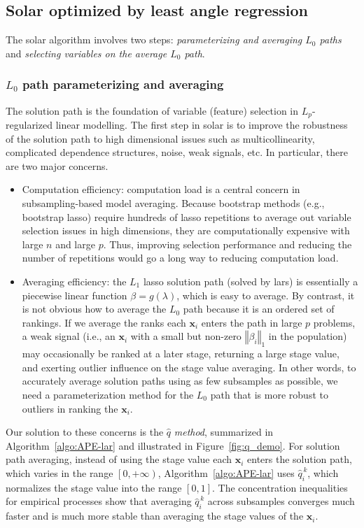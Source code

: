 \documentclass[11pt,review,authoryear]{elsarticle}
\begin{document}
\subsection{Solar optimized by least angle regression}

The solar algorithm involves two steps: \emph{parameterizing and averaging $L_0$ paths} and \emph{selecting variables on the average $L_0$ path}.

\subsubsection{$L_0$ path parameterizing and averaging}

The solution path is the foundation of variable (feature) selection in $L_p$-regularized linear modelling. The first step in solar is to improve the robustness of the solution path to high dimensional issues such as multicollinearity, complicated dependence structures, noise, weak signals, etc. In particular, there are two major concerns.
\begin{itemize}
  \item Computation efficiency: computation load is a central concern in subsampling-based model averaging. Because bootstrap methods (e.g., bootstrap lasso) require hundreds of lasso repetitions to average out variable selection issues in high dimensions, they are computationally expensive with large $n$ and large $p$. Thus, improving selection performance and reducing the number of repetitions would go a long way to reducing computation load.
  \item Averaging efficiency: the $L_1$ lasso solution path (solved by lars) is essentially a piecewise linear function $\beta = g(\lambda)$, which is easy to average. By contrast, it is not obvious how to average the $L_0$ path because it is an ordered set of rankings. If we average the ranks each $\mathbf{x}_i$ enters the path in large $p$ problems, a weak signal (i.e., an $\mathbf{x}_i$ with a small but non-zero $\left\Vert \beta_i \right\Vert_1$ in the population) may occasionally be ranked at a later stage, returning a large stage value, and exerting outlier influence on the stage value averaging. In other words, to accurately average solution paths using as few subsamples as possible, we need a parameterization method for the $L_0$ path that is more robust to outliers in ranking the $\mathbf{x}_i$.
\end{itemize}

\noindent
Our solution to these concerns is the $\widehat{q}$ \emph{method}, summarized in Algorithm~\ref{algo:APE-lar} and illustrated in Figure~\ref{fig:q_demo}. For solution path averaging, instead of using the stage value each $\mathbf{x}_i$ enters the solution path, which varies in the range $\left[0, +\infty \right)$, Algorithm~\ref{algo:APE-lar} uses $\widehat{q}^{\,k}_i$, which normalizes the stage value into the range $\left[ 0,1 \right]$. The concentration inequalities for empirical processes show that averaging $\widehat{q}^{\,k}_i$ across subsamples converges much faster and is much more stable than averaging the stage values of the $\mathbf{x}_i$.
\end{document}
